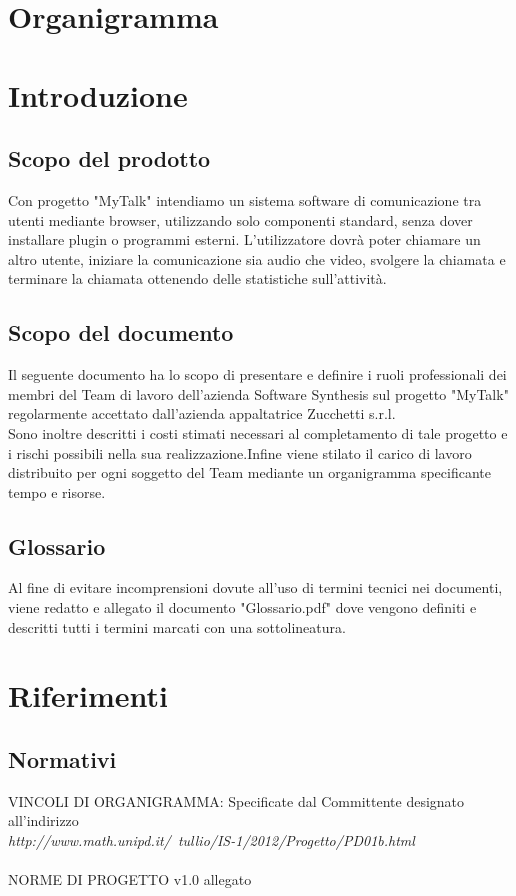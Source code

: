 \section{Organigramma}

\section{Introduzione}
\subsection{Scopo del prodotto}
Con progetto "MyTalk" intendiamo un sistema software di comunicazione tra utenti mediante browser, utilizzando solo componenti standard, senza dover installare plugin o programmi esterni. L'utilizzatore dovrà poter chiamare un altro utente, iniziare la comunicazione sia audio che video, svolgere la chiamata e terminare la chiamata ottenendo delle statistiche sull'attività.

\subsection{Scopo del documento}
Il seguente documento ha lo scopo di presentare e definire i ruoli professionali dei membri del Team di lavoro dell'azienda Software Synthesis sul progetto "MyTalk" regolarmente accettato dall'azienda appaltatrice Zucchetti s.r.l.\\
Sono inoltre descritti i costi stimati necessari al completamento di tale progetto e i rischi possibili nella sua realizzazione.Infine viene stilato il carico di lavoro distribuito per ogni soggetto del Team mediante un organigramma specificante tempo e risorse.
\subsection{Glossario}
Al fine di evitare incomprensioni dovute all'uso di termini tecnici nei documenti, viene redatto e allegato il documento "Glossario.pdf" dove vengono definiti e descritti tutti i termini marcati con una sottolineatura.

\section{Riferimenti}
\subsection{Normativi}
VINCOLI DI ORGANIGRAMMA: Specificate dal Committente designato all'indirizzo\\ \textit{http://www.math.unipd.it/~tullio/IS-1/2012/Progetto/PD01b.html} \\\\
NORME DI PROGETTO  v1.0 allegato

